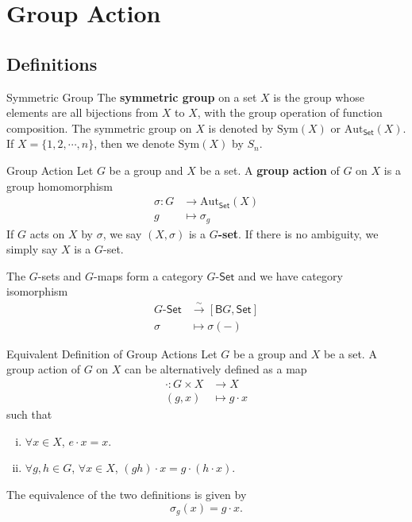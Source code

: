 \section{Group Action}
\subsection{Definitions}
\begin{definition}{Symmetric Group}{}
    The \textbf{symmetric group} on a set $X$ is the group whose elements are all bijections from $X$ to $X$, with the group operation of function composition. The symmetric group on $X$ is denoted by $\mathrm{Sym}(X)$ or $\mathrm{Aut}_{\mathsf{Set}}(X)$. If $X=\{1,2,\cdots,n\}$, then we denote $\mathrm{Sym}(X)$ by $S_n$.
\end{definition}

\begin{definition}{Group Action}{}
    Let $G$ be a group and $X$ be a set. A \textbf{group action} of $G$ on $X$ is a group homomorphism
    \begin{align*}
        \sigma:G & \longrightarrow \mathrm{Aut}_{\mathsf{Set}}(X) \\
        g        & \longmapsto \sigma_g
    \end{align*}
    If $G$ acts on $X$ by $\sigma$, we say $(X,\sigma)$ is a \textbf{$G$-set}. If there is no ambiguity, we simply say $X$ is a $G$-set.
\end{definition}

The $G$-sets and $G$-maps form a category $G\text{-}\mathsf{Set}$ and we have category isomorphism
\begin{align*}
    G\text{-}\mathsf{Set} & \stackrel{\sim}{\longrightarrow}[\mathsf{B}G, \mathsf{Set}] \\
    \sigma                & \longmapsto \sigma(-)
\end{align*}
\begin{proposition}{Equivalent Definition of Group Actions}{}
    Let $G$ be a group and $X$ be a set. A group action of $G$ on $X$ can be alternatively defined as a map
    \begin{align*}
        \cdot:G\times X & \longrightarrow X    \\
        (g,x)           & \longmapsto g\cdot x
    \end{align*}
    such that
    \begin{enumerate}[(i)]
        \item $\forall x\in X$, $e\cdot x=x$.
        \item $\forall g,h\in G$, $\forall x\in X$, $(gh)\cdot x=g\cdot(h\cdot x)$.
    \end{enumerate}
    The equivalence of the two definitions is given by
    \[
        \sigma_g(x)=g\cdot x.
    \]
\end{proposition}

